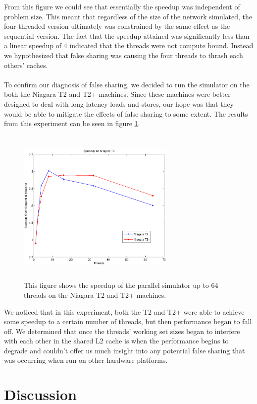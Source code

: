 \documentclass[twocolumn]{article}
\begin{document}
From this figure we could see that essentially the speedup was independent
of problem size.  This meant that regardless of the size of the network
simulated, the four-threaded version ultimately was constrained by the
same effect as the sequential version.  The fact that the speedup
attained was significantly less than a linear speedup of 4 indicated that
the threads were not compute bound.  Instead we hypothesized that false
sharing was causing the four threads to thrash each others' caches.\\
~\\
To confirm our diagnosis of false sharing, we decided to run the simulator
on the both the Niagara T2 and T2+ machines.  Since these machines were
better designed to deal with long latency loads and stores, our hope was
that they would be able to mitigate the effects of false sharing to some
extent.  The results from this experiment can be seen in figure
\ref{niagara}.
\begin{figure}[h]
\centering
\includegraphics[height=3in,width=3in]{niagara.eps}
\caption{\label{niagara}This figure shows the speedup of the parallel simulator
up to 64 threads on the Niagara T2 and T2+ machines.}
\end{figure}
We noticed that in this experiment, both the T2 and T2+ were able to
achieve some speedup to a certain number of threads, but then performance
began to fall off.  We determined that once the threads' working set sizes
began to interfere with each other in the shared L2 cache is when the
performance begins to degrade and couldn't offer us much insight into  any potential false sharing that was occurring when run on other
hardware platforms.

\section{Discussion \label{disc}}

\end{document}
